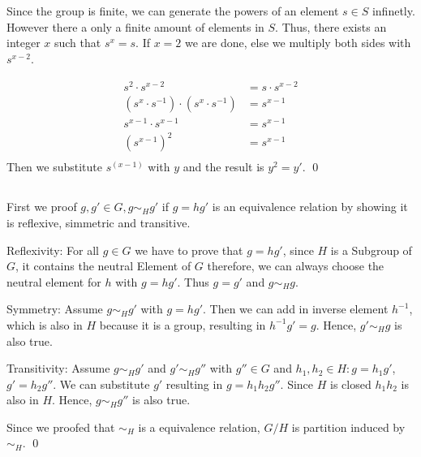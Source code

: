 \documentclass[a4paper,12pt,numbers=noenddot]{scrreport}
\begin{document}
\chapter{}
\section{}
Since the group is finite, we can generate the powers of an element $s \in S$ infinetly.
However there a only a finite amount of elements in $S$. 
Thus, there exists an integer $x$ such that $s^x=s$. 
If $x=2$ we are done, else we multiply both sides with $s^{x-2}$.

\begin{align*}
    s^2 \cdot s^{x-2} &= s \cdot s^{x-2} \\
    (s^{x} \cdot s^{-1}) \cdot (s^{x} \cdot s^{-1}) &= s^{x-1} \\
    s^{x-1} \cdot s^{x-1} &= s^{x-1} \\
    (s^{x-1})^2 &= s^{x-1} \\
\end{align*}
Then we substitute $s^{(x-1)}$ with $y$ and the result is $y^2 = y'$.
\qed

\section{}
First we proof $g,g' \in G, g \sim_H g'$ if $g = hg'$ is an equivalence relation by showing it is reflexive, simmetric and transitive.

Reflexivity:
For all $g \in G$ we have to prove that $g = hg'$, since $H$ is a Subgroup of $G$, it contains the neutral Element of $G$ therefore,
we can always choose the neutral element for $h$ with $g = hg'$. Thus
$g = g'$ and $g \sim_H g$.

Symmetry:
Assume $g \sim_H g'$ with $g = hg'$. Then we can add in inverse element $h^{-1}$, which is also in $H$ because it is a group, resulting in $h^{-1}g'= g$.
Hence, $g' \sim_H g$ is also true.

Transitivity:
Assume $g \sim_H g'$ and $g' \sim_H g''$ with $g'' \in G$ and $h_1, h_2 \in H: g = h_1g'$, $g' = h_2g''$.
We can substitute $g'$ resulting in $g = h_1h_2g''$. Since $H$ is closed $h_1h_2$ is also in $H$. 
Hence, $g \sim_H g''$ is also true.

Since we proofed that $\sim_H$ is a equivalence relation, $G/H$ is partition induced by $\sim_H$.
\qed
\end{document}
